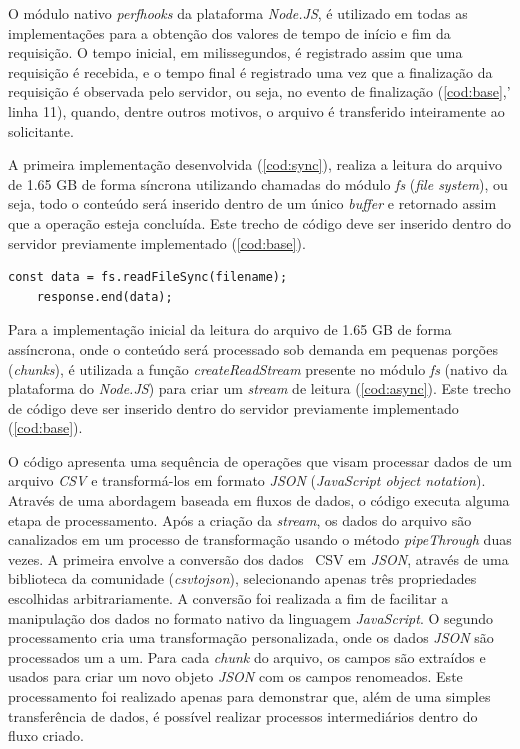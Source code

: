 \documentclass[12pt]{article}
\begin{document}
O módulo nativo \textit{perf\textunderscore hooks} da plataforma \textit{Node.JS}, é utilizado em todas as implementações para a obtenção 
dos valores de tempo de início e fim da requisição. O tempo inicial, em milissegundos, é registrado assim que uma requisição é recebida, 
e o tempo final é registrado uma vez que a finalização da requisição é observada pelo servidor, ou seja, no evento de finalização (\autoref{cod:base},' linha 11),
quando, dentre outros motivos, o arquivo é transferido inteiramente ao solicitante.

A primeira implementação desenvolvida (\autoref{cod:sync}), realiza a leitura do arquivo de 1.65 GB
de forma síncrona utilizando chamadas do módulo \textit{fs} (\textit{file system}), ou seja, todo o conteúdo será
inserido dentro de um único \textit{buffer} e retornado assim que a operação esteja concluída. Este trecho de código
deve ser inserido dentro do servidor previamente implementado (\autoref{cod:base}).

\begin{lstlisting}[caption={Implementação da leitura do arquivo de forma síncrona}, label=cod:sync]
	const data = fs.readFileSync(filename);
	response.end(data);
\end{lstlisting}

Para a implementação inicial da leitura do arquivo de 1.65 GB de forma assíncrona,
onde o conteúdo será processado sob demanda em pequenas porções (\textit{chunks}), é utilizada
a função \textit{createReadStream} presente no módulo \textit{fs} (nativo da plataforma do \textit{Node.JS}) para
criar um \textit{stream} de leitura (\autoref{cod:async}). Este trecho de código deve ser inserido dentro do servidor previamente 
implementado (\autoref{cod:base}).

O código apresenta uma sequência de operações que visam processar dados de um arquivo \textit{CSV} e 
transformá-los em formato \textit{JSON} (\textit{JavaScript object notation}). Através de uma abordagem baseada 
em fluxos de dados, o código executa alguma etapa de processamento. Após a criação da \textit{stream}, 
os dados do arquivo são canalizados em um processo de 
transformação usando o método \textit{pipeThrough} duas vezes. A primeira envolve a 
conversão dos dados \
{CSV} em \textit{JSON}, através de uma biblioteca da comunidade (\textit{csvtojson}), 
selecionando apenas três propriedades escolhidas arbitrariamente. A conversão foi realizada a fim de facilitar
a manipulação dos dados no formato nativo da linguagem \textit{JavaScript}. O segundo processamento cria uma 
transformação personalizada, onde os dados \textit{JSON} são processados um a um. 
Para cada \textit{chunk} do arquivo, os campos são extraídos e usados para criar um novo objeto 
\textit{JSON} com os campos renomeados. Este processamento foi realizado apenas para demonstrar que, além de uma simples
transferência de dados, é possível realizar processos intermediários dentro do fluxo criado.
\end{document}

